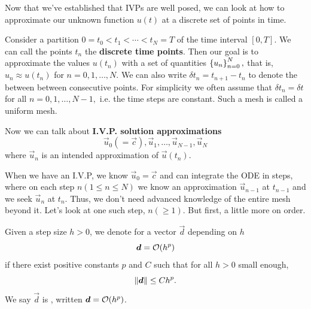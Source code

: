 \documentclass{article}
\begin{document}
Now that we've established that IVPs are well posed, we can look at how to approximate our unknown function $u(t)$ at a discrete set of points in time. 

\begin{definition}
	Consider a \@{partition} $0 = t_0 < t_1 < \cdots < t_N = T$ of the time interval $[0, T].$ We can call the points $t_n$ the \textbf{discrete time points}. Then our goal is to approximate the values $u(t_n)$ with a set of quantities $\left\{ u_n \right\}_{n=0}^N,$ that is, $u_n \approx u(t_n)$ for $n = 0, 1, \dots, N.$ We can also write $\delta t_n = t_{n+1} - t_n$ to denote the  between between consecutive points. For simplicity we often assume that $\delta t_n = \delta t$ for all $n = 0, 1, \dots, N-1,$ i.e. the time steps are constant. Such a mesh is called a \@{uniform mesh}.
\end{definition}

\begin{definition}
	Now we can talk about \textbf{I.V.P. solution approximations}
\[ \vec{u}_0 (=\vec{c}), \vec{u}_1, \dots, \vec{u}_{N-1}, \vec{u}_N \]
	where $\vec{u}_n$ is an intended \@{approximation} of $\vec{u}(t_n).$
\end{definition}

When we have an \@{I.V.P}, we know $\vec{u}_0 = \vec{c}$ and can integrate the ODE in steps, where on each step $n (1 \leq n \leq N)$ we know an approximation $\vec{u}_{n-1}$ at $t_{n-1}$ and we seek $\vec{u}_n$ at $t_n$. Thus, we don't need advanced knowledge of the entire \@{mesh} beyond it. Let's look at one such step, $n (\geq 1)$. But first, a little more on order.

\begin{definition}
	Given a \@{step size} $h > 0$, we denote for a \@{vector} $\vec{d}$ depending on $h$
	\[ \boldsymbol{d} = \mathcal{O}\!\left(h^p\right) \]
	if there exist positive constants $p$ and $C$ such that for all $h > 0$ small enough,
	\[ \left\lVert \boldsymbol{d} \right\rVert \leq Ch^p. \]
	We say $\vec{d}$ is , written $\boldsymbol{d} = \mathcal{O}\!\left(h^p\right)$.
\end{definition}
\end{document}
